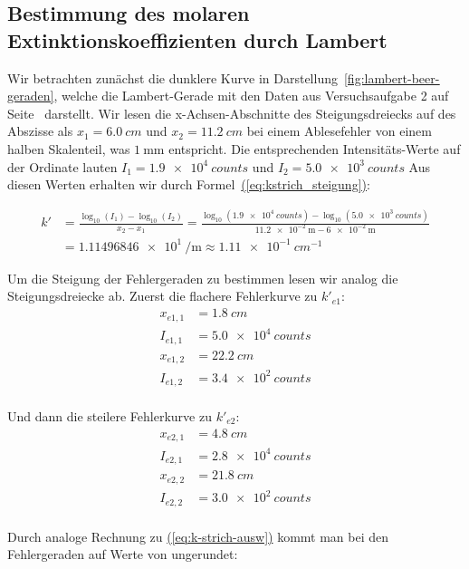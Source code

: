 \documentclass{article}
\let\OrigRef\ref
\renewcommand{\ref}[1]{{\color{linkblue}\uline{\OrigRef{#1}}}}
\renewcommand{\eqref}[1]{{\color{linkblue}\uline{\textup{(\OrigRef{#1})}}}}
\begin{document}
\subsection{Bestimmung des molaren Extinktionskoeffizienten durch Lambert}
\label{sec:ausw-aufg-1}
Wir betrachten zunächst die dunklere Kurve in Darstellung~\ref{fig:lambert-beer-geraden}, welche die 
Lambert-Gerade mit den Daten aus Versuchsaufgabe 2 auf Seite~\pageref{page:messtabelle42} darstellt.
Wir lesen die x-Achsen-Abschnitte des Steigungsdreiecks auf des Abszisse als $x_1 = \qty{6.0}{cm}$ und $x_2 = \qty{11.2}{cm}$
bei einem Ablesefehler von einem halben Skalenteil, was $\qty{1}{\milli \meter}$ entspricht. Die 
entsprechenden Intensitäts-Werte auf der Ordinate lauten $I_1 = \qty{1.9e4}{counts}$ und $I_2 = \qty{5.0e3}{counts}$
Aus diesen Werten erhalten wir durch Formel~\eqref{eq:kstrich_steigung}:

\begin{align}
	k' &= \frac{\log_{10}(I_1) - \log_{10}(I_2)}{x_2 - x_1} 
	= \frac{\log_{10}(\qty{1.9e4}{counts}) - \log_{10}(\qty{5.0e3}{counts})}
	{ \qty{11.2e-2}{\meter} - \qty{6e-2}{\meter} } \\
	&= \qty{1.11496846e1}{\per \meter}
	\approx \qty{1.11e-1}{cm^{-1}}
	\label{eq:k-strich-ausw}
\end{align}

Um die Steigung der Fehlergeraden zu bestimmen lesen wir analog die Steigungsdreiecke ab.
Zuerst die flachere Fehlerkurve zu $k'_{e1}$:
\begin{align}
	x_{e1,1} &= \qty{1.8}{cm}\\
	I_{e1,1} &= \qty{5.0e4}{counts}\\
	x_{e1,2} &= \qty{22.2}{cm}\\
	I_{e1,2} &= \qty{3.4e2}{counts}\\
\end{align}

Und dann die steilere Fehlerkurve zu $k'_{e2}$:
\begin{align}
	x_{e2,1} &= \qty{4.8}{cm}\\
	I_{e2,1} &= \qty{2.8e4}{counts}\\
	x_{e2,2} &= \qty{21.8}{cm}\\
	I_{e2,2} &= \qty{3.0e2}{counts}\\
\end{align}

Durch analoge Rechnung zu \eqref{eq:k-strich-ausw} kommt man bei den Fehlergeraden auf Werte von 
ungerundet:
\end{document}
